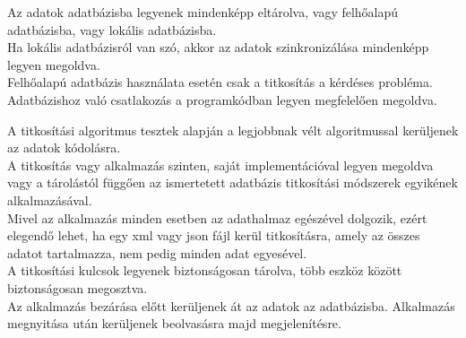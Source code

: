 Az adatok adatbázisba legyenek mindenképp eltárolva, vagy felhőalapú adatbázisba, vagy lokális adatbázisba. 
\\Ha lokális adatbázisról van szó, akkor az adatok szinkronizálása mindenképp legyen megoldva.
\\Felhőalapú adatbázis használata esetén csak a titkosítás a kérdéses probléma.
\\Adatbázishoz való csatlakozás a programkódban legyen megfelelően megoldva.


A titkosítási algoritmus tesztek alapján a legjobbnak vélt algoritmussal kerüljenek az adatok kódolásra.
\\A titkosítás vagy alkalmazás szinten, saját implementációval legyen megoldva vagy a tárolástól függően az ismertetett adatbázis titkosítási módszerek egyikének alkalmazásával.
\\Mivel az alkalmazás minden esetben az adathalmaz egészével dolgozik, ezért elegendő lehet, ha egy xml vagy json fájl kerül titkosításra, amely az összes adatot tartalmazza, nem pedig minden adat egyesével.
\\A titkosítási kulcsok legyenek biztonságosan tárolva, több eszköz között biztonságosan megosztva.
\\Az alkalmazás bezárása előtt kerüljenek át az adatok az adatbázisba. Alkalmazás megnyitása után kerüljenek beolvasásra majd megjelenítésre.
